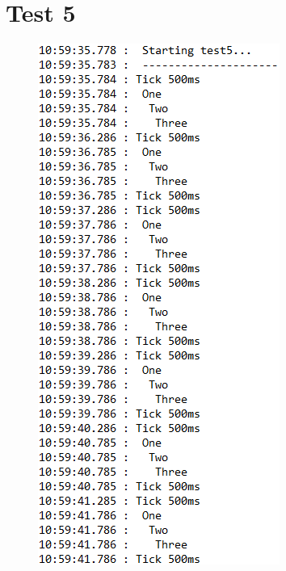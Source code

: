 \documentclass[11pt,titlepage]{report}
\begin{document}
\section{Test 5}
\begin{figure}[H]
	\centering
	\includegraphics[]{Images/tests/test5.PNG}
\end{figure}


\printbibliography[heading=bibintoc]
\end{document}
